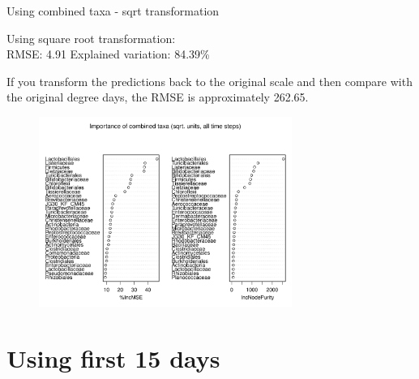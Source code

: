 \documentclass{beamer}
\begin{document}
\begin{frame}{Using combined taxa - sqrt transformation}

  {\scriptsize
    
  \noindent Using square root transformation:\\
  RMSE: 4.91  \hspace{0.05in}  Explained variation: 84.39\%

  \vspace{0.05in}
  
  \noindent If you transform the predictions back to the original
  scale and then compare with the original degree days, the RMSE is
  approximately 262.65.
  
\begin{center}
\begin{figure}
  \includegraphics[width=3.25in]{../all_together/all_time_steps/sqrt_units_all_data_combined_imp_plot}
\end{figure}
\end{center}
\vspace{-0.25in}
}
  
\end{frame}




\section[First 15 days]{Using first 15 days}
\end{document}
